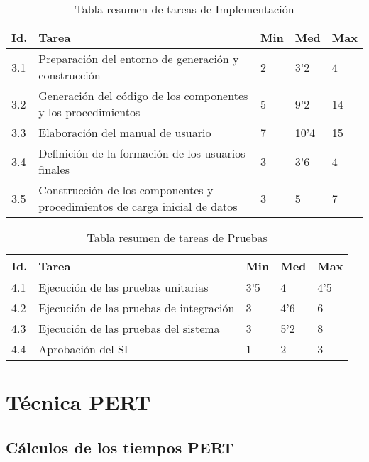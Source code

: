 \documentclass[11pt,a4paper,spanish,twoside]{report}
\begin{document}
\begin{table}[!h]
\centering
  \begin{tabular}{|p{0.8cm}||p{8cm}||p{0.75cm}|p{0.75cm}|p{0.75cm}|}
    \hline
    \textbf{Id.} & \textbf{Tarea} & \textbf{Min} &
    \textbf{Med} & \textbf{Max}\\
    \hline
    3.1 & Preparación del entorno de generación y construcción & 2 & 3'2  & 4 \\
    \hline
    3.2 & Generación del código de los componentes y los procedimientos & 5 &
    9'2 & 14\\
    \hline
    3.3 & Elaboración del manual de usuario & 7 & 10'4 & 15\\
    \hline
    3.4 & Definición de la formación de los usuarios finales & 3 & 3'6 & 4 \\
    \hline
    3.5 & Construcción de los componentes y procedimientos de carga inicial
    de datos & 3 & 5 & 7\\
    \hline
  \end{tabular}
  \caption{Tabla resumen de tareas de Implementación} \label{Tab:tareas3}
\end{table}

\begin{table}[!h]
\centering
  \begin{tabular}{|p{0.8cm}||p{8cm}||p{0.75cm}|p{0.75cm}|p{0.75cm}|}
    \hline
    \textbf{Id.} & \textbf{Tarea} & \textbf{Min} &
    \textbf{Med} & \textbf{Max}\\
    \hline
    4.1 & Ejecución de las pruebas unitarias & 3'5 & 4 & 4'5\\
    \hline
    4.2 & Ejecución de las pruebas de integración & 3 & 4'6 & 6\\
    \hline
    4.3 & Ejecución de las pruebas del sistema & 3 & 5'2 & 8\\
    \hline
    4.4 & Aprobación del SI & 1 & 2 & 3 \\
    \hline
  \end{tabular}
  \caption{Tabla resumen de tareas de Pruebas} \label{Tab:tareas4}
\end{table}


\chapter{Técnica PERT}

\section{Cálculos de los tiempos PERT}
\end{document}
